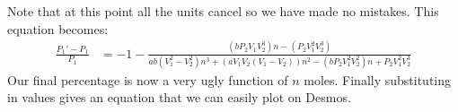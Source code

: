 Note that at this point all the units cancel so we have made no mistakes. This equation becomes:
\begin{align*}
    \frac{P_1'-P_1}{P_1} &= -1 - \frac{(bP_2V_1V_2^3)n - (P_2V_1^2V_2^3)}{ab(V_1^2-V_2^2)n^3 + (aV_1V_2(V_1-V_2))n^2 - (bP_2V_1^2V_2^2)n + P_2V_1^2V_2^3}
\end{align*}
Our final percentage is now a very ugly function of $n$ moles. Finally substituting in values gives an equation that we can easily plot on Desmos.